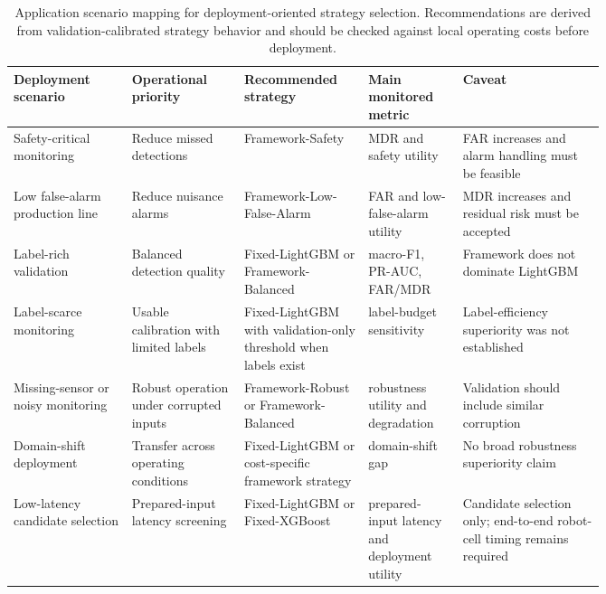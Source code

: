 \begin{table}[!htbp]
\centering
\footnotesize
\setlength{\tabcolsep}{4pt}
\renewcommand{\arraystretch}{1.12}
\caption{Application scenario mapping for deployment-oriented strategy selection. Recommendations are derived from validation-calibrated strategy behavior and should be checked against local operating costs before deployment.}
\label{tab:application-scenario}
\begin{tabularx}{\linewidth}{@{}>{\RaggedRight\arraybackslash}p{0.20\linewidth}>{\RaggedRight\arraybackslash}p{0.19\linewidth}>{\RaggedRight\arraybackslash}p{0.21\linewidth}>{\RaggedRight\arraybackslash}p{0.16\linewidth}>{\RaggedRight\arraybackslash}X@{}}
\toprule
Deployment scenario & Operational priority & Recommended strategy & Main monitored metric & Caveat \\
\midrule
Safety-critical monitoring & Reduce missed detections & Framework-Safety & MDR and safety utility & FAR increases and alarm handling must be feasible \\
Low false-alarm production line & Reduce nuisance alarms & Framework-Low-False-Alarm & FAR and low-false-alarm utility & MDR increases and residual risk must be accepted \\
Label-rich validation & Balanced detection quality & Fixed-LightGBM or Framework-Balanced & macro-F1, PR-AUC, FAR/MDR & Framework does not dominate LightGBM \\
Label-scarce monitoring & Usable calibration with limited labels & Fixed-LightGBM with validation-only threshold when labels exist & label-budget sensitivity & Label-efficiency superiority was not established \\
Missing-sensor or noisy monitoring & Robust operation under corrupted inputs & Framework-Robust or Framework-Balanced & robustness utility and degradation & Validation should include similar corruption \\
Domain-shift deployment & Transfer across operating conditions & Fixed-LightGBM or cost-specific framework strategy & domain-shift gap & No broad robustness superiority claim \\
Low-latency candidate selection & Prepared-input latency screening & Fixed-LightGBM or Fixed-XGBoost & prepared-input latency and deployment utility & Candidate selection only; end-to-end robot-cell timing remains required \\
\bottomrule
\end{tabularx}
\end{table}
